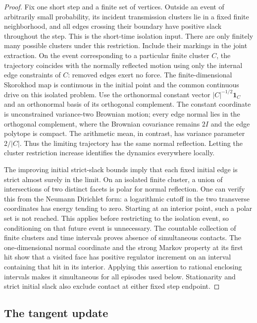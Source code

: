 \begin{proof}
Fix one short step and a finite set of vertices. Outside an event of
arbitrarily small probability, its incident transmission clusters lie in
a fixed finite neighborhood, and all edges crossing their boundary have
positive slack throughout the step. This is the short-time isolation input.
There are only finitely many possible clusters under this restriction.
Include their markings in the joint extraction. On the event corresponding
to a particular finite cluster $C$, the trajectory coincides with the
normally reflected motion using only the internal edge constraints of
$C$: removed edges exert no force. The finite-dimensional Skorokhod map is
continuous in the initial point and the common continuous drive on this
isolated problem. Use the orthonormal constant vector
$|C|^{-1/2}\mathbf1_C$ and an orthonormal basis of its orthogonal
complement. The constant coordinate is unconstrained variance-two
Brownian motion; every edge normal lies in the orthogonal complement,
where the Brownian covariance remains $2I$ and the edge polytope is
compact. The arithmetic mean, in contrast, has variance parameter
$2/|C|$.
Thus the limiting trajectory has the same normal reflection. Letting the
cluster restriction increase identifies the dynamics everywhere locally.

The improving initial strict-slack bounds imply that each fixed initial
edge is strict almost surely in the limit. On an isolated finite cluster,
a union of intersections of two distinct facets is polar for normal
reflection. One can verify this from the Neumann Dirichlet form: a
logarithmic cutoff in the two transverse coordinates has energy tending
to zero. Starting at an interior point, such a polar set is not reached.
This applies before restricting to the isolation event, so conditioning on
that future event is unnecessary. The countable collection of finite
clusters and time intervals proves absence of simultaneous contacts.
The one-dimensional normal coordinate and the strong Markov property at
its first hit show that a visited face has positive regulator increment
on an interval containing that hit in its interior. Applying this assertion
to rational enclosing intervals makes it simultaneous for all episodes
used below. Stationarity and strict initial slack also exclude contact at
either fixed step endpoint.
\end{proof}

\subsection{The tangent update}

